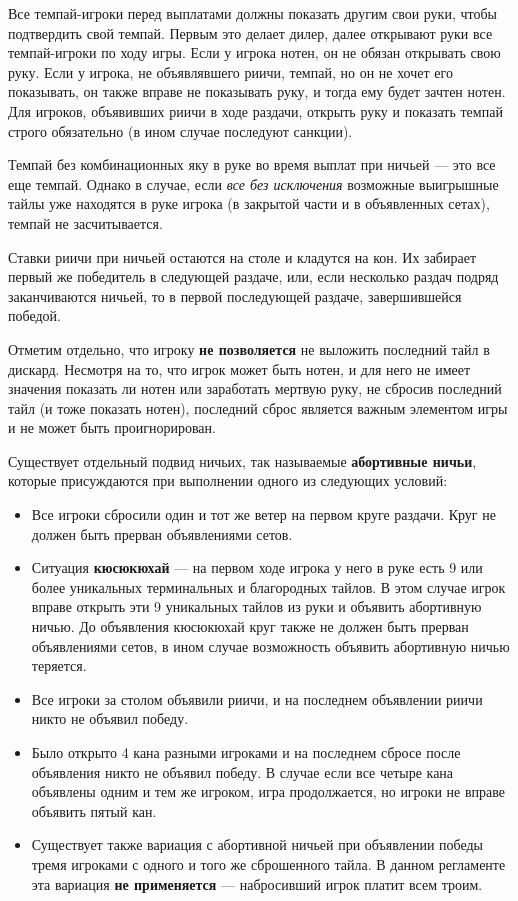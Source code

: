 Все темпай-игроки перед выплатами должны показать другим свои руки, чтобы подтвердить свой темпай. Первым это делает дилер, далее открывают руки все темпай-игроки по ходу игры. Если у игрока нотен, он не обязан открывать свою руку. Если у игрока, не объявлявшего риичи, темпай, но он не хочет его показывать, он также вправе не показывать руку, и тогда ему будет зачтен нотен. Для игроков, объявивших риичи в ходе раздачи, открыть руку и показать темпай строго обязательно (в ином случае последуют санкции).

Темпай без комбинационных яку в руке во время выплат при ничьей --- это все еще темпай. Однако в случае, если \textit{все без исключения} возможные выигрышные тайлы уже находятся в руке игрока (в закрытой части и в объявленных сетах), темпай не засчитывается.

Ставки риичи при ничьей остаются на столе и кладутся на кон. Их забирает первый же победитель в следующей раздаче, или, если несколько раздач подряд заканчиваются ничьей, то в первой последующей раздаче, завершившейся победой. 

Отметим отдельно, что игроку \textbf{не позволяется} не выложить последний тайл в дискард. Несмотря на то, что игрок может быть нотен, и для него не имеет значения показать ли нотен или заработать мертвую руку, не сбросив последний тайл (и тоже показать нотен), последний сброс является важным элементом игры и не может быть проигнорирован.

Существует отдельный подвид ничьих, так называемые \textbf{абортивные ничьи}, которые присуждаются при выполнении одного из следующих условий:
\begin{itemize}
	\item Все игроки сбросили один и тот же ветер на первом круге раздачи. Круг не должен быть прерван объявлениями сетов.
	\item Ситуация \textbf{кюсюкюхай} --- на первом ходе игрока у него в руке есть 9 или более уникальных терминальных и благородных тайлов. В этом случае игрок вправе открыть эти 9 уникальных тайлов из руки и объявить абортивную ничью. До объявления кюсюкюхай круг также не должен быть прерван объявлениями сетов, в ином случае возможность объявить абортивную ничью теряется.
	\item Все игроки за столом объявили риичи, и на последнем объявлении риичи никто не объявил победу.
	\item Было открыто 4 кана разными игроками и на последнем сбросе после объявления никто не объявил победу. В случае если все четыре кана объявлены одним и тем же игроком, игра продолжается, но игроки не вправе объявить пятый кан. 
	\item Существует также вариация с абортивной ничьей при объявлении победы тремя игроками с одного и того же сброшенного тайла. В данном регламенте эта вариация \textbf{не применяется} --- набросивший игрок платит всем троим.
\end{itemize}

